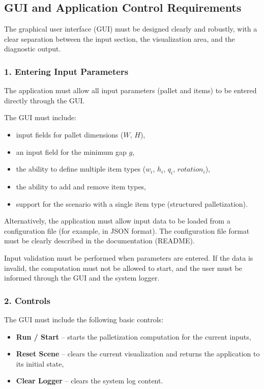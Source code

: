 \documentclass[12pt,a4paper]{article}
\begin{document}
\subsection{GUI and Application Control Requirements}

The graphical user interface (GUI) must be designed
clearly and robustly, with a clear separation between the input section,
the visualization area, and the diagnostic output.

\subsubsection*{1. Entering Input Parameters}

The application must allow all input parameters
(pallet and items) to be entered directly through the GUI.

The GUI must include:

\begin{itemize}
    \item input fields for pallet dimensions ($W$, $H$),
    \item an input field for the minimum gap $g$,
    \item the ability to define multiple item types ($w_i$, $h_i$, $q_i$, $rotation_i$),
    \item the ability to add and remove item types,
    \item support for the scenario with a single item type (structured palletization).
\end{itemize}

Alternatively, the application must allow input data to be loaded
from a configuration file (for example, in JSON format).
The configuration file format must be clearly described
in the documentation (README).

Input validation must be performed when parameters are entered.
If the data is invalid, the computation must not be allowed to start,
and the user must be informed through the GUI
and the system logger.

\subsubsection*{2. Controls}

The GUI must include the following basic controls:

\begin{itemize}
    \item \textbf{Run / Start} -- starts the palletization computation for the current inputs,
    \item \textbf{Reset Scene} -- clears the current visualization and returns the application to its initial state,
    \item \textbf{Clear Logger} -- clears the system log content.
\end{itemize}
\end{document}
